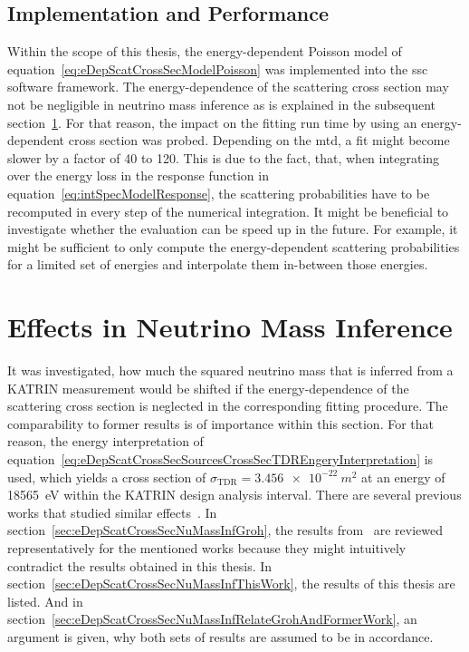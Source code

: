 \subsection{Implementation and Performance}
Within the scope of this thesis, the energy-dependent Poisson model of equation~\eqref{eq:eDepScatCrossSecModelPoisson} was implemented into the \gls{ssc} software framework. The energy-dependence of the scattering cross section may not be negligible in neutrino mass inference as is explained in the subsequent section~\ref{sec:eDepScatCrossSecNuMassInf}. For that reason, the impact on the fitting run time by using an energy-dependent cross section was probed. Depending on the \gls{mtd}, a fit might become slower by a factor of 40 to 120. This is due to the fact, that, when integrating over the energy loss in the response function in equation~\eqref{eq:intSpecModelResponse}, the scattering probabilities have to be recomputed in every step of the numerical integration. It might be beneficial to investigate whether the evaluation can be speed up in the future. For example, it might be sufficient to only compute the energy-dependent scattering probabilities for a limited set of energies and interpolate them in-between those energies.

\section{Effects in Neutrino Mass Inference}
\label{sec:eDepScatCrossSecNuMassInf}
It was investigated, how much the squared neutrino mass that is inferred from a KATRIN measurement would be shifted if the energy-dependence of the scattering cross section is neglected in the corresponding fitting procedure. The comparability to former results is of importance within this section. For that reason, the energy interpretation of equation~\eqref{eq:eDepScatCrossSecSourcesCrossSecTDREngeryInterpretation} is used, which yields a cross section of $\sigma_\mathrm{TDR}=\SI{3.456e-22}{m^2}$ at an energy of \SI{18565}{eV} within the KATRIN design analysis interval. There are several previous works that studied similar effects~\cite{Antoni2015,Groh2015,SeitzM2019,Kuckert2016,Kuckert2018}. In section~\ref{sec:eDepScatCrossSecNuMassInfGroh}, the results from~\cite{Groh2015} are reviewed representatively for the mentioned works because they might intuitively contradict the results obtained in this thesis. In section~\ref{sec:eDepScatCrossSecNuMassInfThisWork}, the results of this thesis are listed. And in section~\ref{sec:eDepScatCrossSecNuMassInfRelateGrohAndFormerWork}, an argument is given, why both sets of results are assumed to be in accordance.

